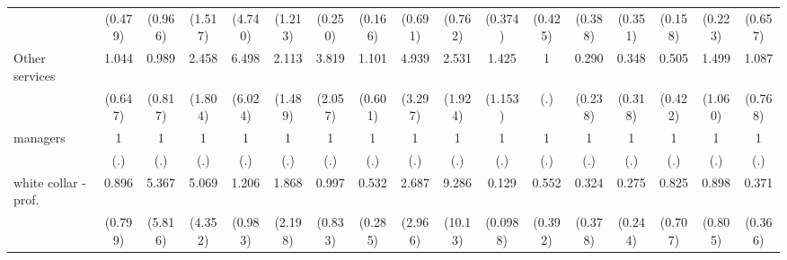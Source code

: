 {\begin{tabular}{l*{16}{c}}
                    &     (0.479)         &     (0.966)         &     (1.517)         &     (4.740)         &     (1.213)         &     (0.250)         &     (0.166)         &     (0.691)         &     (0.762)         &     (0.374)         &     (0.425)         &     (0.388)         &     (0.351)         &     (0.158)         &     (0.223)         &     (0.657)         \\
[1em]
Other services      &       1.044         &       0.989         &       2.458         &       6.498\sym{*}  &       2.113         &       3.819\sym{*}  &       1.101         &       4.939\sym{*}  &       2.531         &       1.425         &           1         &       0.290         &       0.348         &       0.505         &       1.499         &       1.087         \\
                    &     (0.647)         &     (0.817)         &     (1.804)         &     (6.024)         &     (1.489)         &     (2.057)         &     (0.601)         &     (3.297)         &     (1.924)         &     (1.153)         &         (.)         &     (0.238)         &     (0.318)         &     (0.422)         &     (1.060)         &     (0.768)         \\
[1em]
managers            &           1         &           1         &           1         &           1         &           1         &           1         &           1         &           1         &           1         &           1         &           1         &           1         &           1         &           1         &           1         &           1         \\
                    &         (.)         &         (.)         &         (.)         &         (.)         &         (.)         &         (.)         &         (.)         &         (.)         &         (.)         &         (.)         &         (.)         &         (.)         &         (.)         &         (.)         &         (.)         &         (.)         \\
[1em]
white collar - prof.&       0.896         &       5.367         &       5.069         &       1.206         &       1.868         &       0.997         &       0.532         &       2.687         &       9.286\sym{*}  &       0.129\sym{**} &       0.552         &       0.324         &       0.275         &       0.825         &       0.898         &       0.371         \\
                    &     (0.799)         &     (5.816)         &     (4.352)         &     (0.983)         &     (2.198)         &     (0.833)         &     (0.285)         &     (2.966)         &     (10.13)         &    (0.0988)         &     (0.392)         &     (0.378)         &     (0.244)         &     (0.707)         &     (0.805)         &     (0.366)         \\

\end{tabular}}
